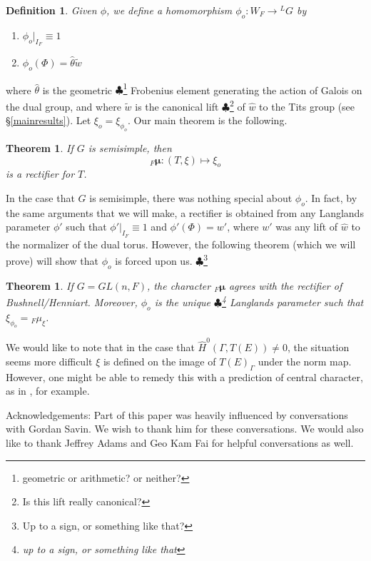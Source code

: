\documentclass[11pt]{amsart}
\theoremstyle{plain}
\newtheorem{theorem}[enumi]{Theorem}
\newtheorem{definition}[enumi]{Definition}
\newcommand{\MAxxx}[1]{$\clubsuit$\footnote{#1}}
\begin{document}
\begin{definition}
Given $\phi$, we define a homomorphism $\phi_o : W_F \rightarrow {}^L G$ by
\begin{enumerate}
\item $\phi_o|_{I_F} \equiv 1$
\item $\phi_o(\Phi) = \hat{\theta} \tilde{w}$
\end{enumerate}
\end{definition}

where $\hat{\theta}$ is the geometric \MAxxx{geometric or arithmetic?  or neither?} Frobenius element generating the action of Galois on the dual group, and where $\tilde{w}$ is the canonical lift \MAxxx{Is this lift really canonical?} of $\hat{w}$ to the Tits group (see \S\ref{mainresults}). Let $\xi_o = \xi_{\phi_o}$.  Our main theorem is the following.

\begin{theorem}
If $G$ is semisimple, then $${}_F \boldsymbol\mu : (T, \xi) \mapsto \xi_o$$ is a rectifier for $T$.
\end{theorem}

In the case that $G$ is semisimple, there was nothing special about $\phi_o$.  In fact, by the same arguments that we will make, a rectifier is obtained from any Langlands parameter $\phi'$ such that $\phi'|_{I_F} \equiv 1$ and $\phi'(\Phi) = w'$, where $w'$ was any lift of $\hat{w}$ to the normalizer of the dual torus.  However, the following theorem (which we will prove) will show that $\phi_o$ is forced upon us. \MAxxx{Up to a sign, or something like that?}

\begin{theorem}
If $G = GL(n,F)$, the character ${}_F \boldsymbol\mu$ agrees with the rectifier of Bushnell/Henniart.  Moreover, $\phi_o$ is the unique \MAxxx{up to a sign, or something like that} Langlands parameter such that $\xi_{\phi_o} = {}_F \mu_{\xi}$.
\end{theorem}

We would like to note that in the case that $\hat{H}^0(\Gamma, T(E)) \neq 0$, the situation seems more difficult $\xi$ is defined on the image of $T(E)_{\Gamma}$ under the norm map.  However, one might be able to remedy this with a prediction of central character, as in \cite{grossreeder}, for example.

Acknowledgements: Part of this paper was heavily influenced by conversations with Gordan Savin.  We wish to thank him for these conversations.  We would also like to thank Jeffrey Adams and Geo Kam Fai for helpful conversations as well.
\end{document}
